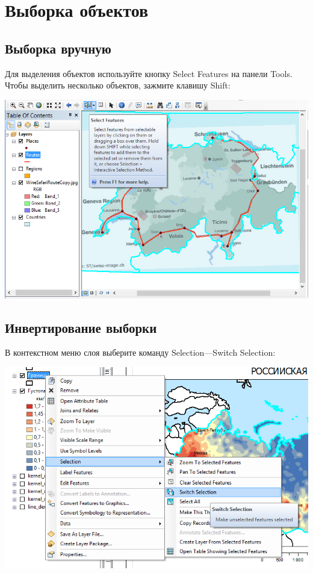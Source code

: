 \documentclass[]{book}
\theoremstyle{definition}
\theoremstyle{definition}
\theoremstyle{definition}
\theoremstyle{remark}
\begin{document}
\hypertarget{manual-select}{%
\chapter{Выборка объектов}\label{manual-select}}

\hypertarget{-}{%
\section{Выборка вручную}\label{-}}

Для выделения объектов используйте кнопку Select Features на панели
Tools. Чтобы выделить несколько объектов, зажмите клавишу Shift:

\includegraphics{images/Appendix/image94.png}

\hypertarget{-}{%
\section{Инвертирование выборки}\label{-}}

В контекстном меню слоя выберите команду Selection---Switch Selection:

\includegraphics{images/Appendix/image95.png}
\end{document}
